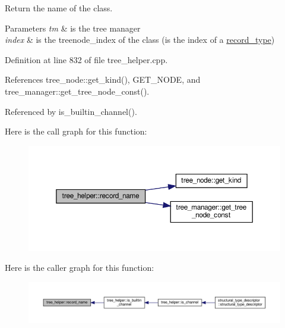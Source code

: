 Return the name of the class. 


\begin{DoxyParams}{Parameters}
{\em tm} & is the tree manager \\
\hline
{\em index} & is the treenode\+\_\+index of the class (is the index of a \hyperlink{structrecord__type}{record\+\_\+type}) \\
\hline
\end{DoxyParams}


Definition at line 832 of file tree\+\_\+helper.\+cpp.



References tree\+\_\+node\+::get\+\_\+kind(), G\+E\+T\+\_\+\+N\+O\+DE, and tree\+\_\+manager\+::get\+\_\+tree\+\_\+node\+\_\+const().



Referenced by is\+\_\+builtin\+\_\+channel().

Here is the call graph for this function\+:
\nopagebreak
\begin{figure}[H]
\begin{center}
\leavevmode
\includegraphics[width=350pt]{d7/d99/classtree__helper_a320dc61da70090a5f995c49625c1dcca_cgraph}
\end{center}
\end{figure}
Here is the caller graph for this function\+:
\nopagebreak
\begin{figure}[H]
\begin{center}
\leavevmode
\includegraphics[width=350pt]{d7/d99/classtree__helper_a320dc61da70090a5f995c49625c1dcca_icgraph}
\end{center}
\end{figure}
\mbox{\label{classtree__helper_a0f1604823bf63206a17b132f605b90ed}} 
